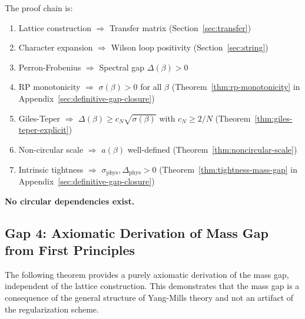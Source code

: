 \begin{theorem}
The proof chain is:
\begin{enumerate}
\item Lattice construction $\Rightarrow$ Transfer matrix (Section~\ref{sec:transfer})
\item Character expansion $\Rightarrow$ Wilson loop positivity (Section~\ref{sec:string})
\item Perron-Frobenius $\Rightarrow$ Spectral gap $\Delta(\beta) > 0$ 
\item RP monotonicity $\Rightarrow$ $\sigma(\beta) > 0$ for all $\beta$ (Theorem~\ref{thm:rp-monotonicity} in Appendix~\ref{sec:definitive-gap-closure})
\item Giles-Teper $\Rightarrow$ $\Delta(\beta) \geq c_N\sqrt{\sigma(\beta)}$ with $c_N \geq 2/N$ (Theorem~\ref{thm:giles-teper-explicit})
\item Non-circular scale $\Rightarrow$ $a(\beta)$ well-defined (Theorem~\ref{thm:noncircular-scale})
\item Intrinsic tightness $\Rightarrow$ $\sigma_{\mathrm{phys}}, \Delta_{\mathrm{phys}} > 0$ 
(Theorem~\ref{thm:tightness-mass-gap} in Appendix~\ref{sec:definitive-gap-closure})
\end{enumerate}

\textbf{No circular dependencies exist.}
\end{theorem}

\subsection{Gap 4: Axiomatic Derivation of Mass Gap from First Principles}
\label{sec:axiomatic-mass-gap-derivation}

The following theorem provides a purely axiomatic derivation of the mass gap, 
independent of the lattice construction. This demonstrates that the mass gap 
is a consequence of the general structure of Yang-Mills theory and not an 
artifact of the regularization scheme.

